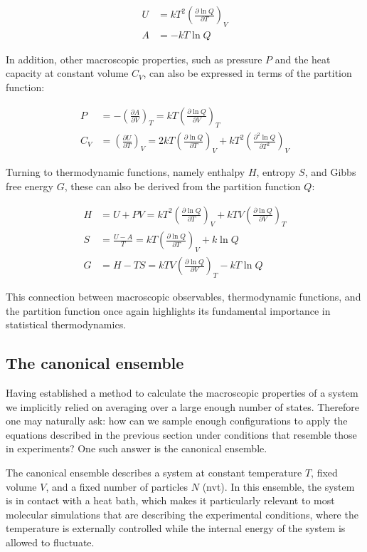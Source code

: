 \begin{align}
    U &= kT^2 \left(\frac{\partial \ln Q}{\partial T}\right)_V \\
    A &= -kT\ln Q
\end{align}

In addition, other macroscopic properties, such as pressure $P$ and the heat capacity at constant volume $C_V$, can also be expressed in terms of the partition function:

\begin{align}
    P &= -\left(\frac{\partial A}{\partial V}\right)_T = kT\left(\frac{\partial \ln Q}{\partial V}\right)_T \\
    C_V &= \left(\frac{\partial U}{\partial T}\right)_V = 2kT\left(\frac{\partial \ln Q}{\partial T}\right)_V + kT^2\left(\frac{\partial^2 \ln Q}{\partial T^2}\right)_V
\end{align}

Turning to thermodynamic functions, namely enthalpy $H$, entropy $S$, and Gibbs free energy $G$, these can also be derived from the partition function $Q$:

\begin{align}
    H &= U + PV = kT^2\left(\frac{\partial \ln Q}{\partial T}\right)_V + kTV\left(\frac{\partial \ln Q}{\partial V}\right)_T \\
    S &= \frac{U-A}{T} = kT\left(\frac{\partial \ln Q}{\partial T}\right)_V + k\ln Q \\
    G &= H - TS = kTV\left(\frac{\partial \ln Q}{\partial V}\right)_T - kT\ln Q
\end{align}

This connection between macroscopic observables, thermodynamic functions, and the partition function once again highlights its fundamental importance in statistical thermodynamics.



\subsection{The canonical ensemble}
Having established a method to calculate the macroscopic properties of a system we implicitly relied on averaging over a large enough number of states. Therefore one may naturally ask: how can we sample enough configurations to apply the equations described in the previous section under conditions that resemble those in experiments? One such answer is the canonical ensemble.

The canonical ensemble describes a system at constant temperature $T$, fixed volume $V$, and a fixed number of particles $N$ (\acs{nvt}). In this ensemble, the system is in contact with a heat bath, which makes it particularly relevant to most molecular simulations that are describing the experimental conditions, where the temperature is externally controlled while the internal energy of the system is allowed to fluctuate.

